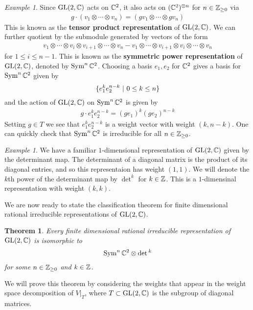 \documentclass{amsart}
\numberwithin{equation}{section}
\theoremstyle{plain} %
\newtheorem{theorem}[equation]{Theorem}
\theoremstyle{definition}
\theoremstyle{remark}
\newtheorem{example}[equation]{Example}
\begin{document}
\begin{example}
Since $\operatorname{GL}(2,\mathbb{C})$ acts on $\mathbb{C}^2$, it also acts on $(\mathbb{C}^2)^{\otimes n}$ for $n\in \mathbb{Z}_{\geq 0}$ via \begin{align*}
    g\cdot (v_1\otimes \cdots \otimes v_n) = (gv_1\otimes \cdots \otimes gv_n)
\end{align*} This is known as the \textbf{tensor product representation} of $\operatorname{GL}(2,\mathbb{C})$. We can further 
quotient by the submodule generated by vectors of the form \begin{align*}
    v_1\otimes \cdots \otimes v_i \otimes v_{i+1} \otimes \cdots \otimes v_n - v_1\otimes \cdots \otimes v_{i+1} \otimes v_i \otimes \cdots \otimes v_n
\end{align*} for $1\leq i \leq n-1$. This is known as the \textbf{symmetric power representation} of $\operatorname{GL}(2,\mathbb{C})$, denoted by $\operatorname{Sym}^n\mathbb{C}^2$.
Choosing a basis $e_1,e_2$ for $\mathbb{C}^2$ gives a basis for $\operatorname{Sym}^n\mathbb{C}^2$ given by \begin{align*}
    \{e_1^ke_2^{n-k} \ \vert \  0\leq k \leq n\}
\end{align*} and the action of $\operatorname{GL}(2,\mathbb{C})$ on $\operatorname{Sym}^n\mathbb{C}^2$ is given by \begin{align*}
g\cdot e_1^ke_2^{n-k} = (ge_1)^k(ge_2)^{n-k}
\end{align*} Setting $g\in T$ we see that $e_1^ke_2^{n-k}$ is a weight vector with weight $(k,n-k)$. One 
can quickly check that $\operatorname{Sym}^n\mathbb{C}^2$ is irreducible for all $n\in \mathbb{Z}_{\geq 0}$.
\end{example}

\begin{example}
    We have a familiar $1$-dimensional representation of $\operatorname{GL}(2,\mathbb{C})$ given by the determinant map. The determinant of a diagonal matrix is the product of its diagonal entries,
    and so this representaion has weight $(1,1)$. We will denote 
    the $k$th power of the determinant map by $\det^k$ for $k\in\mathbb{Z}$. This is a $1$-dimensinal representation with weight $(k,k)$.
\end{example}

We are now ready to state the classification theorem for finite dimensional rational irreducible representations of $\operatorname{GL}(2,\mathbb{C})$.
\begin{theorem}
Every finite dimensional rational irreducible representation of $\operatorname{GL}(2,\mathbb{C})$ is isomorphic to \begin{align*}
    \operatorname{Sym}^n\mathbb{C}^2 \otimes \det{}^k
\end{align*} for some $n\in \mathbb{Z}_{\geq 0}$ and $k\in \mathbb{Z}$.
\end{theorem}
We will prove this theorem by considering the weights that appear in the weight space decomposition of $V\vert_{T}$, where $T\subset \operatorname{GL}(2,\mathbb{C})$ is the subgroup of diagonal matrices.
\end{document}
